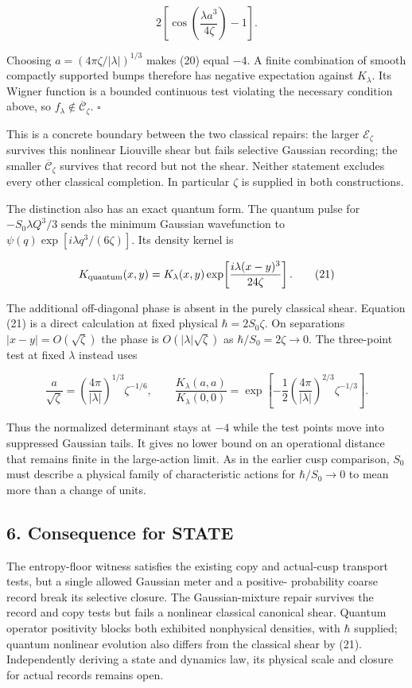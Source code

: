\documentclass[11pt,a4paper]{article}
\begin{document}
\[
 2\left[\cos\!\left(\frac{\lambda a^3}{4\zeta}\right)-1\right]. \tag{20}
\]

Choosing \(a=(4\pi\zeta/|\lambda|)^{1/3}\) makes (20) equal \(-4\). A
finite combination of smooth compactly supported bumps therefore has
negative expectation against \(K_\lambda\). Its Wigner function is a
bounded continuous test violating the necessary condition above, so
\(f_\lambda\notin\overline{\mathcal C}_\zeta\). \(\square\)

This is a concrete boundary between the two classical repairs: the
larger \(\mathcal E_\zeta\) survives this nonlinear Liouville shear but
fails selective Gaussian recording; the smaller
\(\overline{\mathcal C}_\zeta\) survives that record but not the shear.
Neither statement excludes every other classical completion. In
particular \(\zeta\) is supplied in both constructions.

The distinction also has an exact quantum form. The quantum pulse for
\(-S_0\lambda Q^3/3\) sends the minimum Gaussian wavefunction to
\(\psi(q)\exp[i\lambda q^3/(6\zeta)]\). Its density kernel is

\[
 K_{\rm quantum}(x,y)=K_\lambda(x,y)
       \exp\!\left[\frac{i\lambda(x-y)^3}{24\zeta}\right]. \tag{21}
\]

The additional off-diagonal phase is absent in the purely classical
shear. Equation (21) is a direct calculation at fixed physical
\(\hbar=2S_0\zeta\). On separations \(|x-y|=O(\sqrt\zeta)\) the phase is
\(O(|\lambda|\sqrt\zeta)\) as \(\hbar/S_0=2\zeta\to0\). The three-point
test at fixed \(\lambda\) instead uses

\[
 \frac a{\sqrt\zeta}=
 \left(\frac{4\pi}{|\lambda|}\right)^{1/3}\zeta^{-1/6},\qquad
 \frac{K_\lambda(a,a)}{K_\lambda(0,0)}
 =\exp\!\left[-\frac12\left(\frac{4\pi}{|\lambda|}\right)^{2/3}
                     \zeta^{-1/3}\right]. \tag{22}
\]

Thus the normalized determinant stays at \(-4\) while the test points
move into suppressed Gaussian tails. It gives no lower bound on an
operational distance that remains finite in the large-action limit. As
in the earlier cusp comparison, \(S_0\) must describe a physical family
of characteristic actions for \(\hbar/S_0\to0\) to mean more than a
change of units.

\hypertarget{consequence-for-state}{%
\subsection{6. Consequence for STATE}\label{consequence-for-state}}

The entropy-floor witness satisfies the existing copy and actual-cusp
transport tests, but a single allowed Gaussian meter and a positive-
probability coarse record break its selective closure. The
Gaussian-mixture repair survives the record and copy tests but fails a
nonlinear classical canonical shear. Quantum operator positivity blocks
both exhibited nonphysical densities, with \(\hbar\) supplied; quantum
nonlinear evolution also differs from the classical shear by (21).
Independently deriving a state and dynamics law, its physical scale and
closure for actual records remains open.
\end{document}
